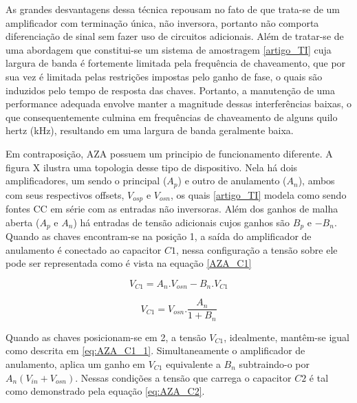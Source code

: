 \documentclass[oneside,openright,12pt]{ufsm_2021} %
\begin{document}
            \par As grandes desvantagens dessa técnica repousam no fato de que trata-se de um amplificador com terminação única, não inversora, portanto não comporta diferenciação de sinal sem fazer uso de circuitos adicionais. Além de tratar-se de uma abordagem que constitui-se um sistema de amostragem \ref{artigo_TI} cuja largura de banda é fortemente limitada pela frequência de chaveamento, que por sua vez é limitada pelas restrições impostas pelo ganho de fase, o quais são induzidos pelo tempo de resposta das chaves. Portanto, a manutenção de uma performance adequada envolve manter a magnitude dessas interferências baixas, o que consequentemente culmina em frequências de chaveamento de alguns quilo hertz (kHz), resultando em uma largura de banda geralmente baixa. 

            \par Em contraposição, AZA possuem um principio de funcionamento diferente. A figura X ilustra uma topologia desse tipo de dispositivo. Nela há dois amplificadores, um sendo o principal ($A_{p}$) e outro de anulamento ($A_{n}$), ambos com seus respectivos offsets, $V_{osp}$ e $V_{osn}$, os quais \ref{artigo_TI} modela como sendo fontes CC em série com as entradas não inversoras. Além dos ganhos de malha aberta ($A_{p}$ e $A_{n}$) há entradas de tensão adicionais cujos ganhos são $B_{p}$ e $-B_{n}$. Quando as chaves encontram-se na posição 1, a saída do amplificador de anulamento é conectado ao capacitor $C1$, nessa configuração a tensão sobre ele pode ser representada como é vista na equação \ref{AZA_C1}
            
            \begin{equation}
            \label{eq:AZA_C1}
                V_{C1}=A_{n}.V_{osn} - B_{n}.V_{C1}
            \end{equation}

            \begin{equation}
            \label{eq:AZA_C1_1}
                V_{C1}=V_{osn}.\frac{A_{n}}{1+B_{n}}
            \end{equation}

            \par Quando as chaves posicionam-se em 2, a tensão $V_{C1}$, idealmente, mantêm-se igual como descrita em \ref{eq:AZA_C1_1}. Simultaneamente o amplificador de anulamento, aplica um ganho em $V_{C1}$ equivalente a $B_{n}$ subtraindo-o por $A_{n}(V_{in}+V_{osn})$. Nessas condições a tensão que carrega o capacitor $C2$ é tal como demonstrado pela equação \ref{eq:AZA_C2}.
\end{document}
